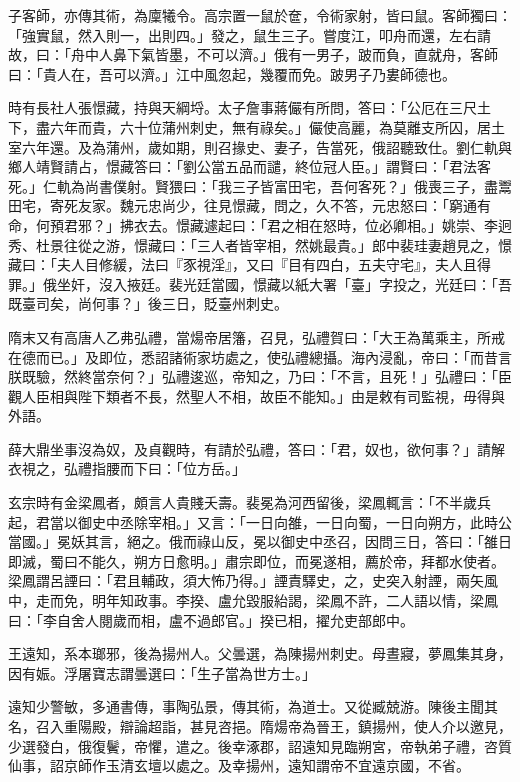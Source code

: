 \begin{pinyinscope}
 子客師，亦傳其術，為廩犧令。高宗置一鼠於奩，令術家射，皆曰鼠。客師獨曰：「強實鼠，然入則一，出則四。」發之，鼠生三子。嘗度江，叩舟而還，左右請故，曰：「舟中人鼻下氣皆墨，不可以濟。」俄有一男子，跛而負，直就舟，客師曰：「貴人在，吾可以濟。」江中風忽起，幾覆而免。跛男子乃婁師德也。



 時有長社人張憬藏，持與天綱埒。太子詹事蔣儼有所問，答曰：「公厄在三尺土下，盡六年而貴，六十位蒲州刺史，無有祿矣。」儼使高麗，為莫離支所囚，居土室六年還。及為蒲州，歲如期，則召掾史、妻子，告當死，俄詔聽致仕。劉仁軌與鄉人靖賢請占，憬藏答曰：「劉公當五品而譴，終位冠人臣。」謂賢曰：「君法客死。」仁軌為尚書僕射。賢猥曰：「我三子皆富田宅，吾何客死？」俄喪三子，盡鬻田宅，寄死友家。魏元忠尚少，往見憬藏，問之，久不答，元忠怒曰：「窮通有命，何預君邪？」拂衣去。憬藏遽起曰：「君之相在怒時，位必卿相。」姚崇、李迥秀、杜景往從之游，憬藏曰：「三人者皆宰相，然姚最貴。」郎中裴珪妻趙見之，憬藏曰：「夫人目修緩，法曰『豕視淫』，又曰『目有四白，五夫守宅』，夫人且得罪。」俄坐奸，沒入掖廷。裴光廷當國，憬藏以紙大署「臺」字投之，光廷曰：「吾既臺司矣，尚何事？」後三日，貶臺州刺史。



 隋末又有高唐人乙弗弘禮，當煬帝居籓，召見，弘禮賀曰：「大王為萬乘主，所戒在德而已。」及即位，悉詔諸術家坊處之，使弘禮總攝。海內浸亂，帝曰：「而昔言朕既驗，然終當奈何？」弘禮逡巡，帝知之，乃曰：「不言，且死！」弘禮曰：「臣觀人臣相與陛下類者不長，然聖人不相，故臣不能知。」由是敕有司監視，毋得與外語。



 薛大鼎坐事沒為奴，及貞觀時，有請於弘禮，答曰：「君，奴也，欲何事？」請解衣視之，弘禮指腰而下曰：「位方岳。」



 玄宗時有金梁鳳者，頗言人貴賤夭壽。裴冕為河西留後，梁鳳輒言：「不半歲兵起，君當以御史中丞除宰相。」又言：「一日向雒，一日向蜀，一日向朔方，此時公當國。」冕妖其言，絕之。俄而祿山反，冕以御史中丞召，因問三日，答曰：「雒日即滅，蜀曰不能久，朔方日愈明。」肅宗即位，而冕遂相，薦於帝，拜都水使者。梁鳳謂呂諲曰：「君且輔政，須大怖乃得。」諲責驛史，之，史突入射諲，兩矢風中，走而免，明年知政事。李揆、盧允毀服紿謁，梁鳳不許，二人語以情，梁鳳曰：「李自舍人閱歲而相，盧不過郎官。」揆已相，擢允吏部郎中。



 王遠知，系本瑯邪，後為揚州人。父曇選，為陳揚州刺史。母晝寢，夢鳳集其身，因有娠。浮屠寶志謂曇選曰：「生子當為世方士。」



 遠知少警敏，多通書傳，事陶弘景，傳其術，為道士。又從臧兢游。陳後主聞其名，召入重陽殿，辯論超詣，甚見咨挹。隋煬帝為晉王，鎮揚州，使人介以邀見，少選發白，俄復鬢，帝懼，遣之。後幸涿郡，詔遠知見臨朔宮，帝執弟子禮，咨質仙事，詔京師作玉清玄壇以處之。及幸揚州，遠知謂帝不宜遠京國，不省。




\end{pinyinscope}
